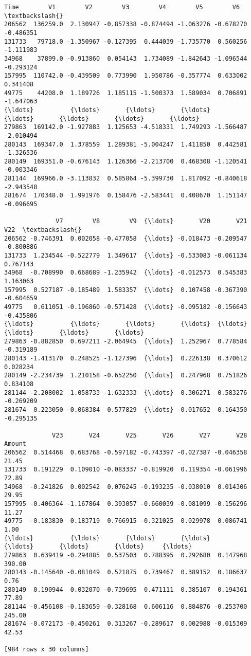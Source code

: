\documentclass[11pt]{article}
\begin{document}
    \begin{Verbatim}[commandchars=\\\{\}]
            Time        V1        V2        V3        V4        V5        V6  \textbackslash{}
206562  136259.0  2.130947 -0.857338 -0.874494 -1.063276 -0.678270 -0.486351
131733   79718.0 -1.350967 -0.127395  0.444039 -1.735770  0.560256 -1.111983
34968    37899.0 -0.913860  0.054143  1.734089 -1.842643 -1.096544 -0.293124
157995  110742.0 -0.439509  0.773990  1.950786 -0.357774  0.633002  0.341408
49775    44208.0  1.189726  1.185115 -1.500373  1.589034  0.706891 -1.647063
{\ldots}          {\ldots}       {\ldots}       {\ldots}       {\ldots}       {\ldots}       {\ldots}       {\ldots}
279863  169142.0 -1.927883  1.125653 -4.518331  1.749293 -1.566487 -2.010494
280143  169347.0  1.378559  1.289381 -5.004247  1.411850  0.442581 -1.326536
280149  169351.0 -0.676143  1.126366 -2.213700  0.468308 -1.120541 -0.003346
281144  169966.0 -3.113832  0.585864 -5.399730  1.817092 -0.840618 -2.943548
281674  170348.0  1.991976  0.158476 -2.583441  0.408670  1.151147 -0.096695

              V7        V8        V9  {\ldots}       V20       V21       V22  \textbackslash{}
206562 -0.746391  0.002058 -0.477058  {\ldots} -0.018473 -0.209547 -0.800886
131733  1.234544 -0.522779  1.349617  {\ldots} -0.533083 -0.061134  0.767143
34968  -0.708990  0.668689 -1.235942  {\ldots} -0.012573  0.545383  1.163063
157995  0.527187 -0.185489  1.583357  {\ldots}  0.107458 -0.367390 -0.604659
49775   0.611051 -0.196860 -0.571428  {\ldots} -0.095182 -0.156643 -0.435806
{\ldots}          {\ldots}       {\ldots}       {\ldots}  {\ldots}       {\ldots}       {\ldots}       {\ldots}
279863 -0.882850  0.697211 -2.064945  {\ldots}  1.252967  0.778584 -0.319189
280143 -1.413170  0.248525 -1.127396  {\ldots}  0.226138  0.370612  0.028234
280149 -2.234739  1.210158 -0.652250  {\ldots}  0.247968  0.751826  0.834108
281144 -2.208002  1.058733 -1.632333  {\ldots}  0.306271  0.583276 -0.269209
281674  0.223050 -0.068384  0.577829  {\ldots} -0.017652 -0.164350 -0.295135

             V23       V24       V25       V26       V27       V28  Amount
206562  0.514468  0.683768 -0.597182 -0.743397 -0.027387 -0.046358   21.45
131733  0.191229  0.109010 -0.083337 -0.819920  0.119354 -0.061996   72.89
34968  -0.241826  0.002542  0.076245 -0.193235 -0.038010  0.014306   29.95
157995 -0.406364 -1.167864  0.393057 -0.660039 -0.081099 -0.156296   11.27
49775  -0.183830  0.183719  0.766915 -0.321025  0.029978  0.086741    1.00
{\ldots}          {\ldots}       {\ldots}       {\ldots}       {\ldots}       {\ldots}       {\ldots}     {\ldots}
279863  0.639419 -0.294885  0.537503  0.788395  0.292680  0.147968  390.00
280143 -0.145640 -0.081049  0.521875  0.739467  0.389152  0.186637    0.76
280149  0.190944  0.032070 -0.739695  0.471111  0.385107  0.194361   77.89
281144 -0.456108 -0.183659 -0.328168  0.606116  0.884876 -0.253700  245.00
281674 -0.072173 -0.450261  0.313267 -0.289617  0.002988 -0.015309   42.53

[984 rows x 30 columns]
\end{Verbatim}
\end{document}
